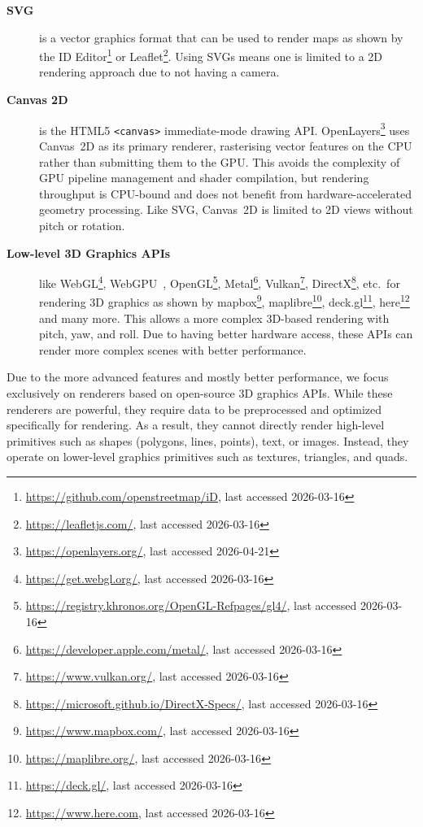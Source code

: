 \begin{description}
\item[\textbf{\ac{SVG}}] \begin{sloppypar} is a vector graphics format that can be used to render maps as shown by the ID Editor\footnote{\url{https://github.com/openstreetmap/iD}, last accessed 2026-03-16} or Leaflet\footnote{\url{https://leafletjs.com/}, last accessed 2026-03-16}.
Using \acp{SVG} means one is limited to a 2D rendering approach due to not having a camera.\end{sloppypar}

\item[\textbf{Canvas 2D}] is the HTML5 \texttt{<canvas>} immediate-mode drawing \ac{API}.
OpenLayers\footnote{\url{https://openlayers.org/}, last accessed 2026-04-21} uses Canvas~2D as its primary renderer, rasterising vector features on the \ac{CPU} rather than submitting them to the \ac{GPU}.
This avoids the complexity of \ac{GPU} pipeline management and shader compilation, but rendering throughput is \ac{CPU}-bound and does not benefit from hardware-accelerated geometry processing.
Like \ac{SVG}, Canvas~2D is limited to 2D views without pitch or rotation.

\item[\textbf{Low-level 3D Graphics \acp{API}}] \begin{sloppypar} like \ac{WebGL}\footnote{\url{https://get.webgl.org/}, last accessed 2026-03-16}, \ac{WebGPU}~\cite{WebGPU}, OpenGL\footnote{\url{https://registry.khronos.org/OpenGL-Refpages/gl4/}, last accessed 2026-03-16}, Metal\footnote{\url{https://developer.apple.com/metal/}, last accessed 2026-03-16}, Vulkan\footnote{\url{https://www.vulkan.org/}, last accessed 2026-03-16}, DirectX\footnote{\url{https://microsoft.github.io/DirectX-Specs/}, last accessed 2026-03-16}, etc.\ for rendering 3D graphics as shown by mapbox\footnote{\url{https://www.mapbox.com/}, last accessed 2026-03-16}, maplibre\footnote{\url{https://maplibre.org/}, last accessed 2026-03-16}, deck.gl\footnote{\url{https://deck.gl/}, last accessed 2026-03-16}, here\footnote{\url{https://www.here.com}, last accessed 2026-03-16} and many more.
This allows a more complex 3D-based rendering with pitch, yaw, and roll.
Due to having better hardware access, these \acp{API} can render more complex scenes with better performance.\end{sloppypar}
\end{description}

Due to the more advanced features and mostly better performance, we focus exclusively on renderers based on open-source 3D graphics \acp{API}.
While these renderers are powerful, they require data to be preprocessed and optimized specifically for rendering.
As a result, they cannot directly render high-level primitives such as shapes (polygons, lines, points), text, or images.
Instead, they operate on lower-level graphics primitives such as textures, triangles, and quads.

